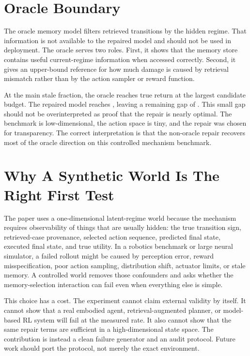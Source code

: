 \documentclass{article}
\begin{document}
\section{Oracle Boundary}
\label{app:oracle}

The oracle memory model filters retrieved transitions by the hidden regime.
That information is not available to the repaired model and should not be used
in deployment. The oracle serves two roles. First, it shows that the memory
store contains useful current-regime information when accessed correctly.
Second, it gives an upper-bound reference for how much damage is caused by
retrieval mismatch rather than by the action sampler or reward function.

At the main stale fraction, the oracle reaches \EvidenceOracleMaxTrue{} true
return at the largest candidate budget. The repaired model reaches
\EvidenceRepairedMaxTrue{}, leaving a remaining gap of \EvidenceOracleGap{}. This
small gap should not be overinterpreted as proof that the repair is nearly
optimal. The benchmark is low-dimensional, the action space is tiny, and the
repair was chosen for transparency. The correct interpretation is that the
non-oracle repair recovers most of the oracle direction on this controlled
mechanism benchmark.

\section{Why A Synthetic World Is The Right First Test}
\label{app:synthetic}

The paper uses a one-dimensional latent-regime world because the mechanism
requires observability of things that are usually hidden: the true transition
sign, retrieved-case provenance, selected action sequence, predicted final
state, executed final state, and true utility. In a robotics benchmark or
large neural simulator, a failed rollout might be caused by perception error,
reward misspecification, poor action sampling, distribution shift, actuator
limits, or stale memory. A controlled world removes those confounders and asks
whether the memory-selection interaction can fail even when everything else is
simple.

This choice has a cost. The experiment cannot claim external validity by
itself. It cannot show that a real embodied agent, retrieval-augmented
planner, or model-based RL system will fail at the measured rate. It also
cannot show that the same repair terms are sufficient in a high-dimensional
state space. The contribution is instead a clean failure generator and an
audit protocol. Future work should port the protocol, not merely the exact
environment.
\end{document}
